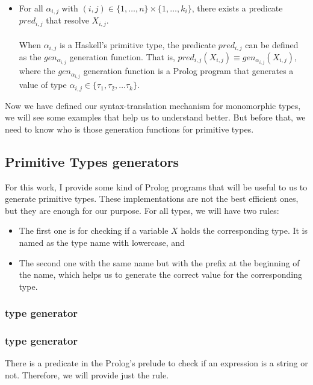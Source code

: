 \begin{itemize}
	\item For all $\alpha_{i,j}$ with $(i,j) \in \{1, \ldots, n \} \times \{1, \ldots, k_i \}$, there exists a predicate $pred_{i,j}$ that resolve $X_{i,j}$.\\\\
	      When $\alpha_{i,j}$ is a Haskell's primitive type, the predicate $pred_{i,j}$ can be defined as the $gen_{\alpha_{i,j}}$ generation function. That is, $pred_{i,j}(X_{i,j}) \equiv gen_{\alpha_{i,j}}(X_{i,j})$, where the $gen_{\alpha_{i,j}}$ generation function is a Prolog program that generates a value of type $\alpha_{i,j} \in \{ \tau_1, \tau_2, \ldots \tau_k \}$.
	      	      	      	      	      
\end{itemize}
Now we have defined our syntax-translation mechanism for monomorphic types, we will see some examples that help us to understand better. But before that, we need to know who is those generation functions for primitive types.
\subsection{Primitive Types generators}
For this work, I provide some kind of Prolog programs that will be useful to us to generate primitive types. These implementations are not the best efficient ones, but they are enough for our purpose. For all types, we will have two rules:
\begin{itemize}
	\item The first one is for checking if a variable $X$ holds the corresponding type. It is named as the type name with lowercase, and
	\item The second one with the same name but with the prefix  at the beginning of the name, which helps us to generate the correct value for the corresponding type.
\end{itemize}
\subsubsection{ type generator}

\subsubsection{ type generator}
There is a predicate  in the Prolog's prelude to check if an expression is a string or not. Therefore, we will provide just the  rule.

